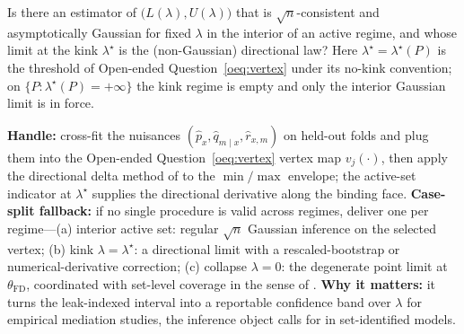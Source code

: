 \documentclass[11pt]{article}
\theoremstyle{definition}
\theoremstyle{plain}
\theoremstyle{remark}
\begin{document}
\begin{openendedquestion}\label{oeq:inference}
Is there an estimator of $\bigl(L(\lambda),U(\lambda)\bigr)$ that is $\sqrt n$-consistent and asymptotically
Gaussian for fixed $\lambda$ in the interior of an active regime, and whose limit at the kink $\lambda^\star$
is the (non-Gaussian) directional law? Here $\lambda^\star=\lambda^\star(P)$ is the threshold of Open-ended
Question~\ref{oeq:vertex} under its no-kink convention; on $\{P:\lambda^\star(P)=+\infty\}$ the kink regime is
empty and only the interior Gaussian limit is in force.

\smallskip\noindent\textbf{Handle:} cross-fit the nuisances $(\hat p_x,\hat q_{m\mid x},\hat r_{x,m})$ on
held-out folds and plug them into the Open-ended Question~\ref{oeq:vertex} vertex map
$v_j(\cdot)$, then apply the directional delta method of \citet{FangSantos2019DirectionallyDifferentiable} to
the $\min/\max$ envelope; the active-set indicator at $\lambda^\star$ supplies the directional derivative
along the binding face.
\textbf{Case-split fallback:} if no single procedure is valid across regimes, deliver one per regime---(a)
interior active set: regular $\sqrt n$ Gaussian inference on the selected vertex; (b) kink
$\lambda=\lambda^\star$: a directional limit with a rescaled-bootstrap or numerical-derivative correction; (c)
collapse $\lambda=0$: the degenerate point limit at $\theta_{\mathrm{FD}}$, coordinated with set-level
coverage in the sense of \citet{ChernozhukovHongTamer2007ParameterSets}.
\textbf{Why it matters:} it turns the leak-indexed interval into a reportable confidence band over
$\lambda$ for empirical mediation studies, the inference object \citet{ChernozhukovHongTamer2007ParameterSets}
calls for in set-identified models.
\end{openendedquestion}
\end{document}
